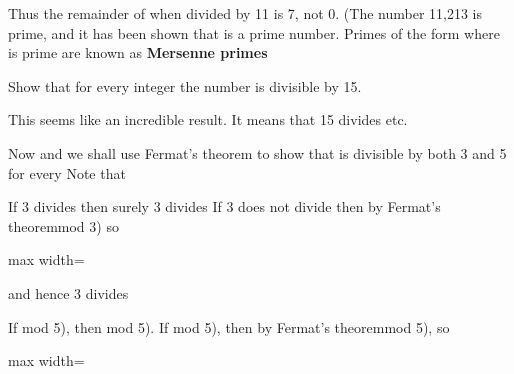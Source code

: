 \documentclass[11pt,oneside]{article}
\begin{document}
\begin{BookBody}
\noindent Thus the remainder of  when divided by 11 is 7, not 0. (The number 11,213 is prime, and it has been shown that  is a prime number. Primes of the form  where  is prime are known as\textbf{ Mersenne primes}\BookEnd{\blacktriangle}

\end{BookBody}

\BookNarrativetrue

\begin{BookBody}

 Show that for every integer  the number  is divisible by 15.

 This seems like an incredible result. It means that 15 divides  etc.

Now  and we shall use Fermat’s theorem to show that  is divisible by both 3 and 5 for every  Note that 

If 3 divides  then surely 3 divides  If 3 does not divide  then by Fermat’s theoremmod 3) so

\begin{center}\begin{adjustbox}{max width=\linewidth}\end{adjustbox}\end{center}

\noindent and hence 3 divides 

If mod 5), then mod 5). If mod 5), then by Fermat’s theoremmod 5), so

\begin{center}\begin{adjustbox}{max width=\linewidth}\end{adjustbox}\end{center}


\end{BookBody}
\end{document}
